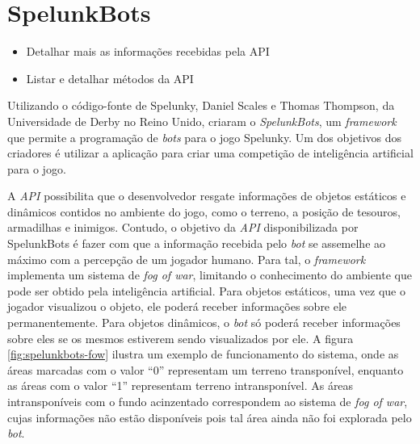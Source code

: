 \chapter{\label{chap:spelunkbots}SpelunkBots}

\begin{mdframed}[backgroundcolor=green!20]
\begin{itemize}
    \item
        Detalhar mais as informações recebidas pela API
    \item
        Listar e detalhar métodos da API
\end{itemize}
\end{mdframed}

Utilizando o código-fonte de Spelunky, Daniel Scales e Thomas Thompson, da
Universidade de Derby no Reino Unido, criaram o
\textit{SpelunkBots}\cite{SPELUNKBOTSPAPER}, um
\textit{framework} que permite a programação de \textit{bots} para o jogo
Spelunky. Um dos objetivos dos criadores é utilizar a aplicação para criar uma
competição de inteligência artificial para o jogo.

A \textit{API} possibilita que o desenvolvedor resgate informações de objetos
estáticos e dinâmicos contidos no ambiente do jogo, como o terreno, a
posição de tesouros, armadilhas e inimigos. Contudo, o objetivo da \textit{API}
disponibilizada por SpelunkBots é fazer com que a informação recebida pelo
\textit{bot} se assemelhe ao máximo com a percepção de um jogador humano.  Para
tal, o \textit{framework} implementa um sistema de \textit{fog of war},
limitando o conhecimento do ambiente que pode ser obtido pela inteligência
artificial. Para objetos estáticos, uma vez que o jogador visualizou o objeto,
ele poderá receber informações sobre ele permanentemente. Para objetos
dinâmicos, o \textit{bot} só poderá receber informações sobre eles se os mesmos
estiverem sendo visualizados por ele. A figura \ref{fig:spelunkbots-fow} ilustra
um exemplo de funcionamento do sistema, onde as áreas marcadas com o valor ``0''
representam um terreno transponível, enquanto as áreas com o valor ``1''
representam terreno intransponível. As áreas intransponíveis com o fundo
acinzentado correspondem ao sistema de \textit{fog of war}, cujas informações
não estão disponíveis pois tal área ainda não foi explorada pelo \textit{bot}.

